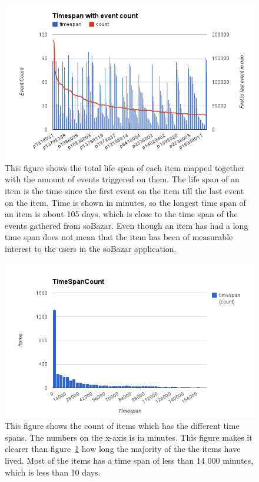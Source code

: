     \begin{figure}[H]
        \includegraphics[width=5in]{image/item-timespan-event-count.png}
        \centering
        \caption[Life time of items mapped with event count]{This figure shows the total life span of each item mapped together with the amount of events triggered on them.
        The life span of an item is the time since the first event on the item till the last event on the item.
        Time is shown in minutes, so the longest time span of an item is about 105 days, which is close to the time span of the events gathered from soBazar.
        Even though an item has had a long time span does not mean that the item has been of measurable interest to the users in the soBazar application.}
        \label{figure:itemTimeSpanEventCount}
    \end{figure}

    \begin{figure}[H]
        \includegraphics[width=5in]{image/time-span-count.png}
        \centering
        \caption[Count of the different time spans of the items]{This figure shows the count of items which has the different time spans.
        The numbers on the x-axis is in minutes.
        This figure makes it clearer than figure~\ref{figure:itemTimeSpanEventCount} how long the majority of the the items have lived.
        Most of the items has a time span of less than 14 000 minutes, which is less than 10 days.}
    \end{figure}

